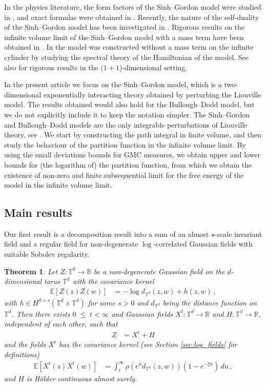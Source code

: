 \documentclass[11pt]{article}
\numberwithin{equation}{section}
\newcounter{exa}
\newtheorem{theorem}{Theorem}[section]
\theoremstyle{definition}
\renewcommand{\leq}{\;\leqslant\;}                   %
\newcommand{\R}{\mathbb{R}}
\newcommand{\E}{\mathbb{E}}
\def\T{\mathbb{T}}
\begin{document}
In the physics literature, the form factors of the Sinh--Gordon model were studied in \cite{ KM, FMS}, and exact formulas were obtained in \cite{zam, FLZZ, ztba, teschner}. Recently, the nature of the self-duality of the Sinh--Gordon model has been investigated in \cite{KLM, BLC, til}. Rigorous results on the infinite volume limit of the Sinh--Gordon model with a mass term have been obtained in \cite{fro, AHK, BV}. In \cite{GGV} the model was constructed without a mass term on the infinite cylinder by studying the spectral theory of the Hamiltonian of the model. See also \cite{koz1, koz2} for rigorous results in the ($1+1$)-dimensional setting.


In the present article we focus on the Sinh--Gordon model, which is a  two-dimensional exponentially interacting theory obtained by perturbing the Liouville model. The results obtained would also hold for the Bullough--Dodd model, but we do not explicitly include it to keep the notation simpler. The Sinh--Gordon and Bullough--Dodd models are the only integrable perturbations of Liouville theory, see \cite{mussardo, Dor}. We start by constructing the path integral in finite volume, and then study the behaviour of the partition function in the infinite volume limit. By using the small deviations bounds for GMC measures, we obtain upper and lower bounds for (the logarithm of) the partition function, from which we obtain the existence of non-zero and finite subsequential limit for the free energy of the  model in the infinite volume limit.


\subsection{Main results}

Our first result is a decomposition result into a sum of an almost $\star$-scale invariant field and a regular field for non-degenerate $\log$-correlated Gaussian fields with suitable Sobolev regularity.

\begin{theorem}\label{thm:decomposition}
Let $Z:\T^d \to \R$ be a non-degenerate Gaussian field on the $d$-dimensional torus $\T^d$ with the covariance kernel
\begin{align*}
\E[Z(z)Z(w)] &= - \log d_{\T^d}(z,w) + h(z,w)\,,
\end{align*}
with $h \in H^{d+s}(\T^d \times \T^d)$ for some $s>0$ and $d_{\T^d}$ being the distance function on $\T^d$. Then there exists $0\leq t <\infty$ and  Gaussian fields $X^{t}: \T^d \to \R$ and $H: \T^d \to \R$, independent of each other, such that 
\begin{align*}
Z &= X^{t} + H
\end{align*}
and the fields $X^t$ has the covariance kernel (see Section \ref{sec:log_fields} for definitions)
\begin{align*}
\E[X^t(z) X^t(w)] &= \int_t^\infty \rho(e^u d_{\T^d}(z,w))(1-e^{-\xi u}) \, du \,,
\end{align*}
and $H$ is Hölder continuous almost surely.
\end{theorem}
\end{document}

